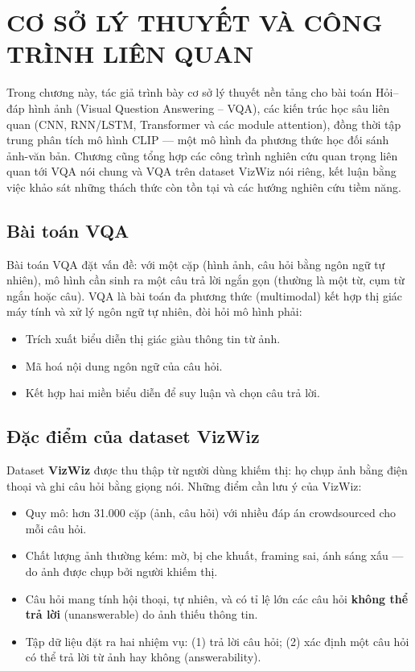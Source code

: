 \chapter{CƠ SỞ LÝ THUYẾT VÀ CÔNG TRÌNH LIÊN QUAN}
\label{chap:chap2-theory}

Trong chương này, tác giả trình bày cơ sở lý thuyết nền tảng cho bài toán Hỏi–đáp hình ảnh (Visual Question Answering -- VQA), các kiến trúc học sâu liên quan (CNN, RNN/LSTM, Transformer và các module attention), đồng thời tập trung phân tích mô hình CLIP — một mô hình đa phương thức học đối sánh ảnh-văn bản. 
Chương cũng tổng hợp các công trình nghiên cứu quan trọng liên quan tới VQA nói chung và VQA trên dataset VizWiz nói riêng, kết luận bằng việc khảo sát những thách thức còn tồn tại và các hướng nghiên cứu tiềm năng.

\section{Bài toán VQA}
Bài toán VQA đặt vấn đề: với một cặp (hình ảnh, câu hỏi bằng ngôn ngữ tự nhiên), mô hình cần sinh ra một câu trả lời ngắn gọn (thường là một từ, cụm từ ngắn hoặc câu). VQA là bài toán đa phương thức (multimodal) kết hợp thị giác máy tính và xử lý ngôn ngữ tự nhiên, đòi hỏi mô hình phải:
\begin{itemize}
    \item Trích xuất biểu diễn thị giác giàu thông tin từ ảnh.
    \item Mã hoá nội dung ngôn ngữ của câu hỏi.
    \item Kết hợp hai miền biểu diễn để suy luận và chọn câu trả lời.
\end{itemize}

\section{Đặc điểm của dataset VizWiz}
Dataset \textbf{VizWiz} được thu thập từ người dùng khiếm thị: họ chụp ảnh bằng điện thoại và ghi câu hỏi bằng giọng nói. Những điểm cần lưu ý của VizWiz:
\begin{itemize}
    \item Quy mô: hơn 31.000 cặp (ảnh, câu hỏi) với nhiều đáp án crowdsourced cho mỗi câu hỏi.
    \item Chất lượng ảnh thường kém: mờ, bị che khuất, framing sai, ánh sáng xấu — do ảnh được chụp bởi người khiếm thị. 
    \item Câu hỏi mang tính hội thoại, tự nhiên, và có tỉ lệ lớn các câu hỏi \textbf{không thể trả lời} (unanswerable) do ảnh thiếu thông tin.
    \item Tập dữ liệu đặt ra hai nhiệm vụ: (1) trả lời câu hỏi; (2) xác định một câu hỏi có thể trả lời từ ảnh hay không (answerability).
\end{itemize}

